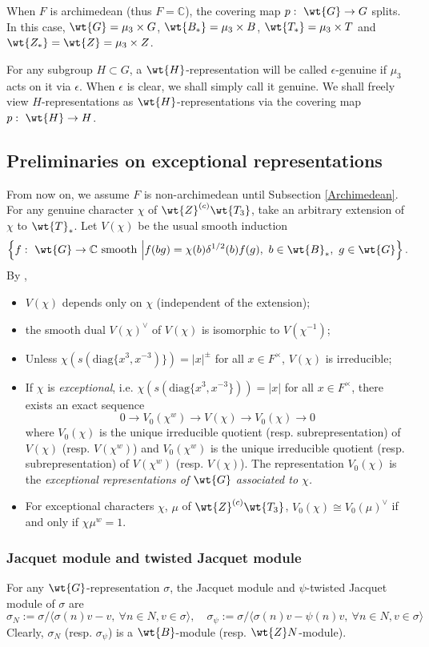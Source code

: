 \documentclass[11pt,reqno]{amsart}
\newcommand{\BC}{{\mathbb {C}}} \newcommand{\BD}{{\mathbb {D}}}
\newcommand{\diag}{{\mathrm{diag}}}
\newcommand{\lra}{\longrightarrow}\newcommand{\lla}{\longleftarrow}
\theoremstyle{plain}
\theoremstyle{remark} \newtheorem{remark}[thm]{Remark}
\theoremstyle{definition} \newtheorem{exercise}[thm]{Exercise}
\theoremstyle{definition} \newtheorem{example}[thm]{Example} \newtheorem{condition}[thm]{Condition}
\numberwithin{equation}{section}
\renewcommand{\-}{\text{--}}
\begin{document}
When $F$ is archimedean (thus $F=\BC$), the covering map $p:\ \wt{G}\to G$ splits. In this case, $\wt{G}=\mu_3\times G$, $\wt{B_*}=\mu_3\times B$,  $\wt{T_*}=\mu_3\times T$ and $\wt{Z_*}=\wt{Z}=\mu_3\times Z$.

For any subgroup $H\subset G$, a $\wt{H}$-representation will be called  $\epsilon$-genuine if $\mu_3$ acts on it via $\epsilon$. When $\epsilon$ is clear, we shall simply call it genuine. We shall freely view $H$-representations as $\wt{H}$-representations via the covering map $p:\ \wt{H}\to H$.
\subsection{Preliminaries on exceptional representations}
From now on, we assume $F$ is non-archimedean until Subsection \ref{Archimedean}. For any genuine character $\chi$ of $\wt{Z}^{(c)}\wt{T_3}$,  take an arbitrary extension  of $\chi$ to $\wt{T}_*$. Let $V(\chi)$ be the usual   smooth induction $$\left\{f:\ \wt{G}\to\BC\ \text{smooth}\ \Big| f(bg)=\chi(b)\delta^{1/2}(b)f(g),\ b\in\wt{B}_*,\ g\in\wt{G}\right\}.$$ 
 By \cite[Section I.1-2]{KP84}, \begin{itemize}
    \item $V(\chi)$  depends only on $\chi$ (independent of the extension);
    \item the smooth dual $V(\chi)^\vee$ of $V(\chi)$ is isomorphic to $V(\chi^{-1})$;
    \item Unless $\chi(s(\diag\{x^3,x^{-3})\})=|x|^\pm$ for all $x\in F^\times$, $V(\chi)$ is irreducible;
    \item If $\chi$ is {\em exceptional}, i.e. $\chi(s(\diag\{x^3,x^{-3}\}))=|x|$ for all $x\in F^\times$, there exists an exact sequence
    $$0\lra V_0(\chi^w)\lra V(\chi)\lra V_0(\chi)\lra 0$$
    where $V_0(\chi)$ is the unique irreducible quotient (resp. subrepresentation) of $V(\chi)$ (resp. $V(\chi^w)$) and  $V_0(\chi^w)$ is the unique irreducible quotient (resp. subrepresentation) of $V(\chi^w)$ (resp. $V(\chi)$).  The representation $V_0(\chi)$ is the \em{exceptional representations} of $\wt{G}$ associated to $\chi$.
    \item For exceptional characters $\chi$, $\mu$ of $\wt{Z}^{(c)}\wt{T_3}$, $V_0(\chi)\cong V_0(\mu)^\vee$ if and only if $\chi\mu^w=1$.
    \end{itemize}  
    \subsubsection{Jacquet module and twisted Jacquet module}
    For any $\wt{G}$-representation $\sigma$, the Jacquet module and $\psi$-twisted Jacquet module of $\sigma$ are \[\sigma_N:=\sigma/\langle \sigma(n)v-v,\ \forall n\in N, v\in\sigma\rangle,\quad \sigma_\psi:=\sigma/\langle \sigma(n)v-\psi(n)v,\ \forall n\in N, v\in\sigma\rangle\]
 Clearly, $\sigma_N$ (resp. $\sigma_\psi$) is a $\wt{B}$-module (resp. $\wt{Z}N$-module). 
 
\end{document}
